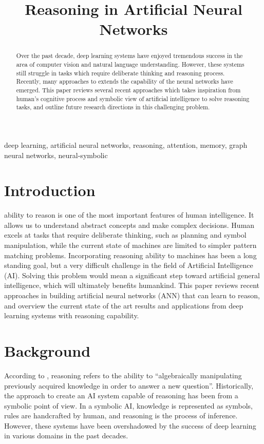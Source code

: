 \documentclass[journal]{IEEEtran}
\begin{document}
\title{Reasoning in Artificial Neural Networks}

\author{%
}

\maketitle


\begin{abstract}
Over the past decade, deep learning systems have enjoyed tremendous success in the area of computer vision and natural language understanding.
However, these systems still struggle in tasks which require deliberate thinking and reasoning process. 
Recently, many approaches to extends the capability of the neural networks have emerged. 
This paper reviews several recent approaches which takes inspiration from human's cognitive process and symbolic view of artificial intelligence
to solve reasoning tasks, and outline future research directions in this challenging problem.
\end{abstract}

\begin{IEEEkeywords}
deep learning, artificial neural networks, reasoning, attention, memory, graph neural networks, neural-symbolic
\end{IEEEkeywords}

\section{Introduction}

 ability to reason is one of the most important features of human intelligence. 
It allows us to understand abstract concepts and make complex decisions.
Human excels at tasks that require deliberate thinking, such as planning and symbol manipulation, 
while the current state of machines are limited to simpler pattern matching problems.
Incorporating reasoning ability to machines has been a long standing goal, but a very difficult challenge in the field of Artificial Intelligence (AI). 
Solving this problem would mean a significant step toward artificial general intelligence, which will ultimately benefits humankind. 
This paper reviews recent approaches in building artificial neural networks (ANN) that can learn to reason, 
and overview the current state of the art results and applications from deep learning systems with reasoning capability.

\section{Background}
According to \cite{bottou2014machine}, reasoning refers to the ability to ``algebraically manipulating previously acquired knowledge in order to answer a new question''.
Historically, the approach to create an AI system capable of reasoning has been from a symbolic point of view.
In a symbolic AI, knowledge is represented as symbols, rules are handcrafted by human, and reasoning is the process of inference.
However, these systems have been overshadowed by the success of deep learning in various domains in the past decades.
\end{document}
